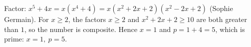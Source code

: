 Factor: $x^5+4x=x(x^4+4)=x\left(x^2+2x+2\right)\left(x^2-2x+2\right)$ (Sophie Germain). For $x\ge2$, the factors $x\ge2$ and $x^2+2x+2\ge10$ are both greater than $1$, so the number is composite. Hence $x=1$ and $p=1+4=5$, which is prime: $\boxed{x=1,\ p=5}$.
